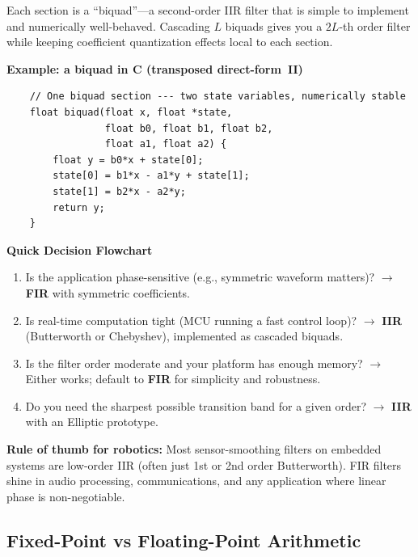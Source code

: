 Each section is a ``biquad''---a second-order IIR filter that is simple to
implement and numerically well-behaved. Cascading $L$ biquads gives you a
$2L$-th order filter while keeping coefficient quantization effects local to each
section.

\textbf{Example: a biquad in C (transposed direct-form~II)}
\begin{verbatim}
    // One biquad section --- two state variables, numerically stable
    float biquad(float x, float *state,
                 float b0, float b1, float b2,
                 float a1, float a2) {
        float y = b0*x + state[0];
        state[0] = b1*x - a1*y + state[1];
        state[1] = b2*x - a2*y;
        return y;
    }
\end{verbatim}

\vspace{0.5em}
\begin{mdframed}[linewidth=1pt, innertopmargin=10pt, innerbottommargin=10pt]
\textbf{Quick Decision Flowchart}

\vspace{0.3em}
\begin{enumerate}[nosep]
    \item Is the application phase-sensitive (e.g., symmetric waveform matters)?
          $\rightarrow$ \textbf{FIR} with symmetric coefficients.
    \item Is real-time computation tight (MCU running a fast control loop)?
          $\rightarrow$ \textbf{IIR} (Butterworth or Chebyshev), implemented as
          cascaded biquads.
    \item Is the filter order moderate and your platform has enough memory?
          $\rightarrow$ Either works; default to \textbf{FIR} for simplicity and
          robustness.
    \item Do you need the sharpest possible transition band for a given order?
          $\rightarrow$ \textbf{IIR} with an Elliptic prototype.
\end{enumerate}

\textbf{Rule of thumb for robotics:} Most sensor-smoothing filters on embedded
systems are low-order IIR (often just 1st or 2nd order Butterworth). FIR filters
shine in audio processing, communications, and any application where linear phase
is non-negotiable.
\end{mdframed}

\subsection{Fixed-Point vs Floating-Point Arithmetic}


